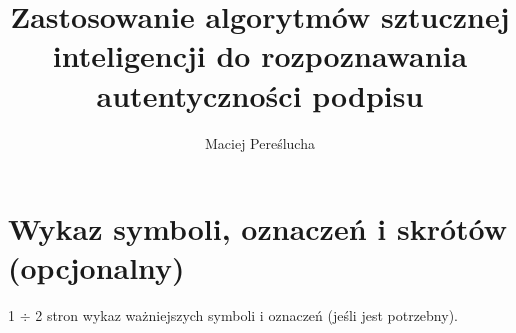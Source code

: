 \documentclass[12pt,twoside,openright]{article}
\author{Maciej Pereślucha}
\title{Zastosowanie algorytmów sztucznej inteligencji do rozpoznawania autentyczności podpisu}
\begin{document}
\maketitle

\cleardoublepage

\tableofcontents

\cleardoublepage



\section*{Wykaz symboli, oznaczeń i skrótów (opcjonalny)}
%

1 $\div$ 2 stron wykaz ważniejszych symboli i oznaczeń (jeśli jest potrzebny).
\end{document}
